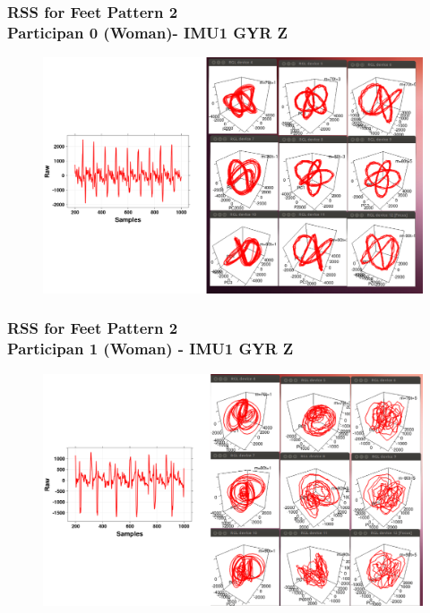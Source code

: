\documentclass{beamer}
\begin{document}
\begin{frame}
\frametitle{RSS for Feet Pattern 2 \\ Participan 0 (Woman)- IMU1 GYR Z }
\vspace{-0.5cm}

\begin{figure}
\centering 
\includegraphics[scale=0.25]{woman0} \\
\end{figure}

\end{frame}

\begin{frame}
\frametitle{RSS for Feet Pattern 2 \\ Participan 1 (Woman) - IMU1 GYR Z }
\vspace{-0.5cm}

\begin{figure}
\centering 
\includegraphics[scale=0.25]{woman1} \\
\end{figure}

\end{frame}
\end{document}
